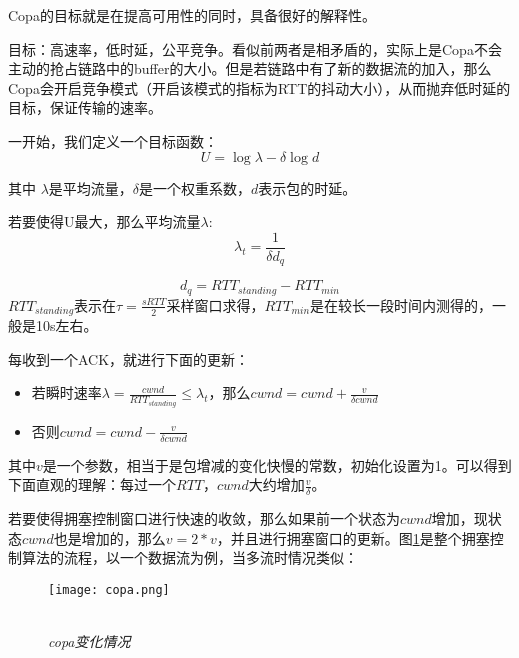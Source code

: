 \documentclass[a4paper, 12pt, UTF8]{ctexart}
\begin{document}

\par Copa\cite{DBLP:conf/nsdi/ArunB18}的目标就是在提高可用性的同时，具备很好的解释性。

\par 目标：高速率，低时延，公平竞争。看似前两者是相矛盾的，实际上是Copa不会主动的抢占链路中的buffer的大小。但是若链路中有了新的数据流的加入，那么Copa会开启竞争模式（开启该模式的指标为RTT的抖动大小），从而抛弃低时延的目标，保证传输的速率。

\par 一开始，我们定义一个目标函数：
$$
U = \log\lambda-\delta \log d
$$
\par 其中 $\lambda$是平均流量，$\delta$是一个权重系数，$d$表示包的时延。

\par 若要使得U最大，那么平均流量$\lambda$:
$$
\lambda_t = \frac{1}{\delta d_q}
$$

$$
d_q = RTT_{standing}-RTT_{min}
$$
$RTT_{standing}$表示在$ \tau = \frac{sRTT}{2}$采样窗口求得，$RTT_{min}$是在较长一段时间内测得的，一般是10s左右。

\par 每收到一个ACK，就进行下面的更新：\\
\begin{itemize}
	\item 若瞬时速率$\lambda = \frac{cwnd}{RTT_{standing}}\le \lambda_{t}$，那么$cwnd = cwnd+\frac{v}{\delta cwnd}$
	\item 否则$cwnd = cwnd - \frac{v}{\delta cwnd}$\\
\end{itemize}

\par 其中$v$是一个参数，相当于是包增减的变化快慢的常数，初始化设置为1。可以得到下面直观的理解：每过一个$RTT$，$cwnd$大约增加$\frac{v}{\delta}$。

\par 若要使得拥塞控制窗口进行快速的收敛，那么如果前一个状态为$cwnd$增加，现状态$cwnd$也是增加的，那么$v=2*v$，并且进行拥塞窗口的更新。图\ref{fig:copa algorithm}是整个拥塞控制算法的流程，以一个数据流为例，当多流时情况类似：
\begin{figure}[H]
	\centering \texttt{[image: copa.png]}
	\\ \hspace*{\fill} \\
	\caption{\em copa变化情况}
	\label{fig:copa algorithm}
\end{figure}
\end{document}
